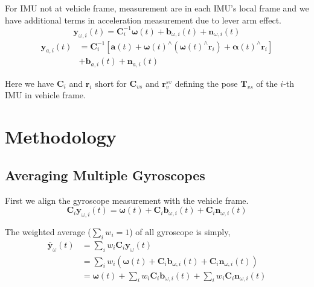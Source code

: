 \documentclass[conference]{IEEEtran}
\begin{document}
For IMU not at vehicle frame, measurement are in each IMU's local frame and we have additional terms in acceleration measurement due to lever arm effect.
\begin{equation}
    \textbf{y}_{\omega,i}(t) = \textbf{C}_{i}^{-1} \bm{\omega}(t) + \textbf{b}_{\omega, i}(t) + \textbf{n}_{\omega,i}(t)
\end{equation}
\begin{equation}
\begin{split}
    \textbf{y}_{a,i}(t) &= \textbf{C}_i^{-1} \left[ \textbf{a}(t) + \bm{\omega}(t)^\wedge (\bm{\omega}(t)^\wedge \textbf{r}_i) + \bm{\alpha}(t)^\wedge \textbf{r}_i \right] \\
    &+ \textbf{b}_{a,i}(t) + \textbf{n}_{a,i}(t)
\end{split}
\end{equation}

Here we have $\textbf{C}_i$ and $\textbf{r}_i$ short for $\textbf{C}_{vs}$ and $\textbf{r}_v^{sv}$ defining the pose $\textbf{T}_{vs}$ of the $i$-th IMU in vehicle frame.

\section{Methodology}\label{methodology}

\subsection{Averaging Multiple Gyroscopes}

First we align the gyroscope measurement with the vehicle frame.
\begin{equation}
    \textbf{C}_{i} \textbf{y}_{\omega,i}(t) = \bm{\omega}(t) + \textbf{C}_{i} \textbf{b}_{\omega, i}(t) + \textbf{C}_{i} \textbf{n}_{\omega,i}(t)
\end{equation}

The weighted average ($\sum_i{w_i} = 1$) of all gyroscope is simply,
\begin{equation}
\begin{split}
    \bar{\textbf{y}}_\omega(t) &= \sum_i{w_i \textbf{C}_{i} \textbf{y}_\omega(t)} \\
    &= \sum_i{w_i \left( \bm{\omega}(t) + \textbf{C}_{i} \textbf{b}_{\omega,i}(t) + \textbf{C}_{i} \textbf{n}_{\omega,i}(t) \right)} \\
    &= \bm{\omega}(t) + \sum_i{w_i \textbf{C}_{i} \textbf{b}_{\omega,i}(t)} + \sum_i{w_i \textbf{C}_{i} \textbf{n}_{\omega,i}(t)}
\end{split}
\end{equation}
\end{document}
